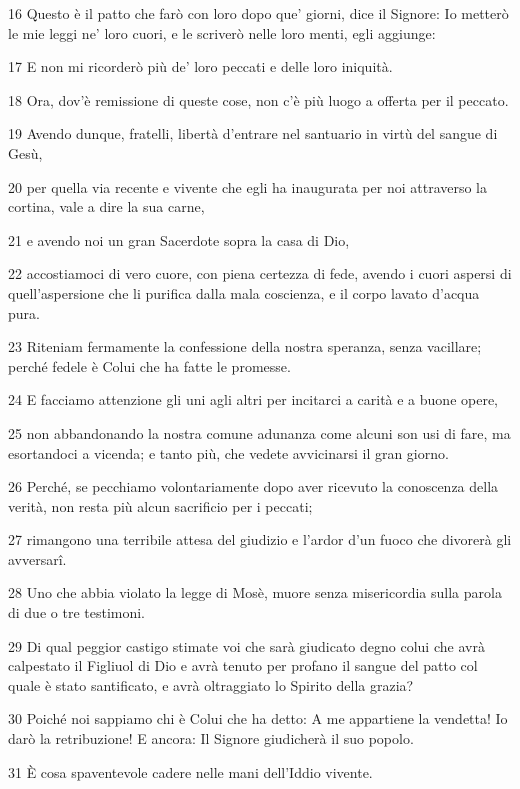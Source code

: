 \par 16 Questo è il patto che farò con loro dopo que' giorni, dice il Signore: Io metterò le mie leggi ne' loro cuori, e le scriverò nelle loro menti, egli aggiunge:
\par 17 E non mi ricorderò più de' loro peccati e delle loro iniquità.
\par 18 Ora, dov'è remissione di queste cose, non c'è più luogo a offerta per il peccato.
\par 19 Avendo dunque, fratelli, libertà d'entrare nel santuario in virtù del sangue di Gesù,
\par 20 per quella via recente e vivente che egli ha inaugurata per noi attraverso la cortina, vale a dire la sua carne,
\par 21 e avendo noi un gran Sacerdote sopra la casa di Dio,
\par 22 accostiamoci di vero cuore, con piena certezza di fede, avendo i cuori aspersi di quell'aspersione che li purifica dalla mala coscienza, e il corpo lavato d'acqua pura.
\par 23 Riteniam fermamente la confessione della nostra speranza, senza vacillare; perché fedele è Colui che ha fatte le promesse.
\par 24 E facciamo attenzione gli uni agli altri per incitarci a carità e a buone opere,
\par 25 non abbandonando la nostra comune adunanza come alcuni son usi di fare, ma esortandoci a vicenda; e tanto più, che vedete avvicinarsi il gran giorno.
\par 26 Perché, se pecchiamo volontariamente dopo aver ricevuto la conoscenza della verità, non resta più alcun sacrificio per i peccati;
\par 27 rimangono una terribile attesa del giudizio e l'ardor d'un fuoco che divorerà gli avversarî.
\par 28 Uno che abbia violato la legge di Mosè, muore senza misericordia sulla parola di due o tre testimoni.
\par 29 Di qual peggior castigo stimate voi che sarà giudicato degno colui che avrà calpestato il Figliuol di Dio e avrà tenuto per profano il sangue del patto col quale è stato santificato, e avrà oltraggiato lo Spirito della grazia?
\par 30 Poiché noi sappiamo chi è Colui che ha detto: A me appartiene la vendetta! Io darò la retribuzione! E ancora: Il Signore giudicherà il suo popolo.
\par 31 È cosa spaventevole cadere nelle mani dell'Iddio vivente.
